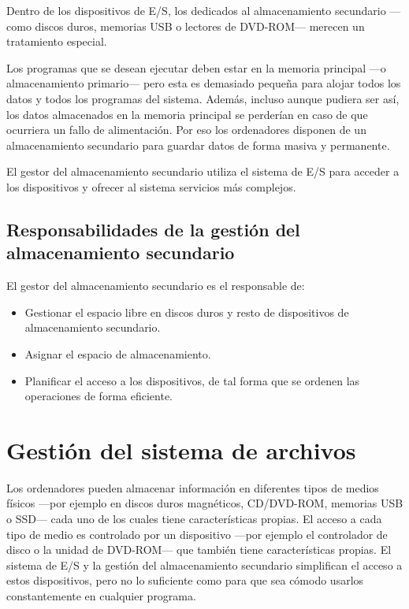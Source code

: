 {} Dentro de los dispositivos de E/S, los dedicados al almacenamiento
secundario ---como discos duros, memorias USB o lectores de DVD-ROM---
merecen un tratamiento especial.

Los programas que se desean ejecutar deben estar en la memoria principal
---o almacenamiento primario--- pero esta es demasiado pequeña para
alojar todos los datos y todos los programas del sistema. Además,
incluso aunque pudiera ser así, los datos almacenados en la memoria
principal se perderían en caso de que ocurriera un fallo de
alimentación. Por eso los ordenadores disponen de un almacenamiento
secundario para guardar datos de forma masiva y permanente.

El gestor del almacenamiento secundario utiliza el sistema de E/S para
acceder a los dispositivos y ofrecer al sistema servicios más complejos.

\subsection{Responsabilidades de la gestión del almacenamiento
secundario}\label{_responsabilidades_de_la_gestiuxf3n_del_almacenamiento_secundario}

El gestor del almacenamiento secundario es el responsable de:

\begin{itemize}
\item
  Gestionar el espacio libre en discos duros y resto de dispositivos de
  almacenamiento secundario.
\item
  Asignar el espacio de almacenamiento.
\item
  Planificar el acceso a los dispositivos, de tal forma que se ordenen
  las operaciones de forma eficiente.
\end{itemize}

\section{Gestión del sistema de
archivos}\label{_gestiuxf3n_del_sistema_de_archivos}

{} Los ordenadores pueden almacenar información en diferentes tipos de
medios físicos ---por ejemplo en discos duros magnéticos, CD/DVD-ROM,
memorias USB o SSD--- cada uno de los cuales tiene características
propias. El acceso a cada tipo de medio es controlado por un dispositivo
---por ejemplo el controlador de disco o la unidad de DVD-ROM--- que
también tiene características propias. El sistema de E/S y la gestión
del almacenamiento secundario simplifican el acceso a estos
dispositivos, pero no lo suficiente como para que sea cómodo usarlos
constantemente en cualquier programa.


